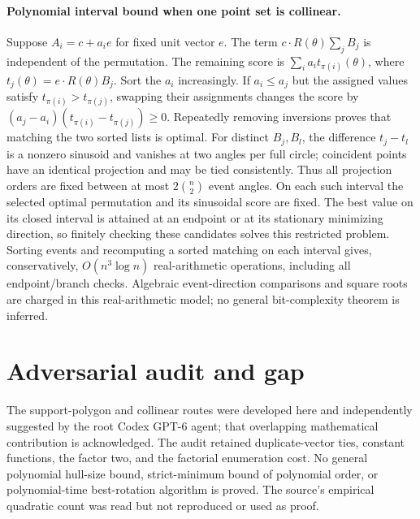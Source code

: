 \documentclass[11pt]{article}
\begin{document}
\paragraph{Polynomial interval bound when one point set is collinear.}
Suppose $A_i=c+a_i e$ for fixed unit vector $e$. The term
$c\cdot R(\theta)\sum_jB_j$ is independent of the permutation.
The remaining score is $\sum_i a_i t_{\pi(i)}(\theta)$, where
$t_j(\theta)=e\cdot R(\theta)B_j$. Sort the $a_i$ increasingly.
If $a_i\le a_j$ but the assigned values satisfy $t_{\pi(i)}>t_{\pi(j)}$,
swapping their assignments changes the score by
$(a_j-a_i)(t_{\pi(i)}-t_{\pi(j)})\ge0$.
Repeatedly removing inversions proves that matching the two sorted lists is
optimal. For distinct $B_j,B_l$, the difference $t_j-t_l$ is a nonzero
sinusoid and vanishes at two angles per full circle; coincident points have
an identical projection and may be tied consistently. Thus all projection
orders are fixed between at most $2\binom n2$ event angles. On each such
interval the selected optimal permutation and its sinusoidal score are fixed.
The best value on its closed interval is attained at an endpoint or at its
stationary minimizing direction, so finitely checking these candidates solves
this restricted problem. Sorting events and recomputing a sorted matching
on each interval gives, conservatively, $O(n^3\log n)$ real-arithmetic
operations, including all endpoint/branch checks. Algebraic event-direction
comparisons and square roots are charged in this real-arithmetic model;
no general bit-complexity theorem is inferred.

\section{Adversarial audit and gap}
The support-polygon and collinear routes were developed here and independently
suggested by the root Codex GPT-6 agent; that overlapping mathematical
contribution is acknowledged. The audit retained duplicate-vector ties,
constant functions, the factor two, and the factorial enumeration cost.
No general polynomial hull-size bound, strict-minimum bound of polynomial
order, or polynomial-time best-rotation algorithm is proved. The source's
empirical quadratic count was read but not reproduced or used as proof.
\end{document}
